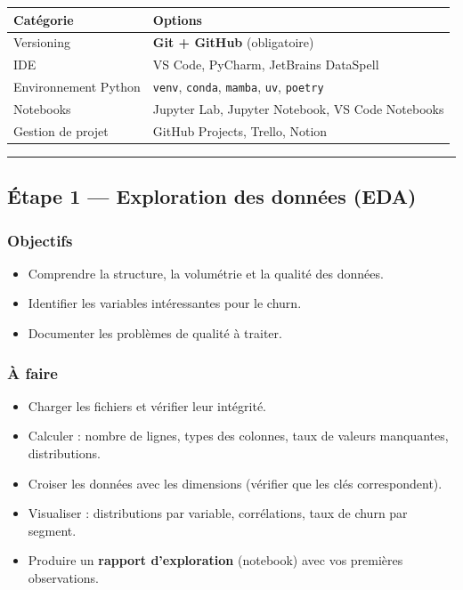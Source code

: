 \documentclass[11pt,a4paper]{article}
\providecommand{\tightlist}{\setlength{\itemsep}{0pt}\setlength{\parskip}{0pt}}
\begin{document}
{\def\LTcaptype{none} %
\begin{longtable}[]{@{}ll@{}}
\toprule\noalign{}
Catégorie & Options \\
\midrule\noalign{}
\endhead
\bottomrule\noalign{}
\endlastfoot
Versioning & \textbf{Git + GitHub} (obligatoire) \\
IDE & VS Code, PyCharm, JetBrains DataSpell \\
Environnement Python & \texttt{venv}, \texttt{conda}, \texttt{mamba},
\texttt{uv}, \texttt{poetry} \\
Notebooks & Jupyter Lab, Jupyter Notebook, VS Code Notebooks \\
Gestion de projet & GitHub Projects, Trello, Notion \\
\end{longtable}
}

\begin{center}\rule{0.5\linewidth}{0.5pt}\end{center}

\subsection{Étape 1 --- Exploration des données
(EDA)}\label{uxe9tape-1-exploration-des-donnuxe9es-eda}

\subsubsection{Objectifs}\label{objectifs-1}

\begin{itemize}
\tightlist
\item
  Comprendre la structure, la volumétrie et la qualité des données.
\item
  Identifier les variables intéressantes pour le churn.
\item
  Documenter les problèmes de qualité à traiter.
\end{itemize}

\subsubsection{À faire}\label{uxe0-faire-1}

\begin{itemize}
\tightlist
\item
  Charger les fichiers et vérifier leur intégrité.
\item
  Calculer : nombre de lignes, types des colonnes, taux de valeurs
  manquantes, distributions.
\item
  Croiser les données avec les dimensions (vérifier que les clés
  correspondent).
\item
  Visualiser : distributions par variable, corrélations, taux de churn
  par segment.
\item
  Produire un \textbf{rapport d'exploration} (notebook) avec vos
  premières observations.
\end{itemize}
\end{document}
